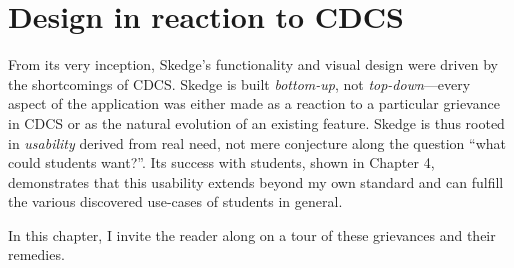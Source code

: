 
\chapter{Design in reaction to CDCS}

From its very inception, Skedge's functionality and visual design were driven by the shortcomings of CDCS. Skedge is built \emph{bottom-up}, not \emph{top-down}---every aspect of the application was either made as a reaction to a particular grievance in CDCS or as the natural evolution of an existing feature. Skedge is thus rooted in \emph{usability} derived from real need, not mere conjecture along the question ``what could students want?''. Its success with students, shown in Chapter 4, demonstrates that this usability extends beyond my own standard and can fulfill the various discovered use-cases of students in general.

In this chapter, I invite the reader along on a tour of these grievances and their remedies.



\clearpage



\clearpage



\clearpage


